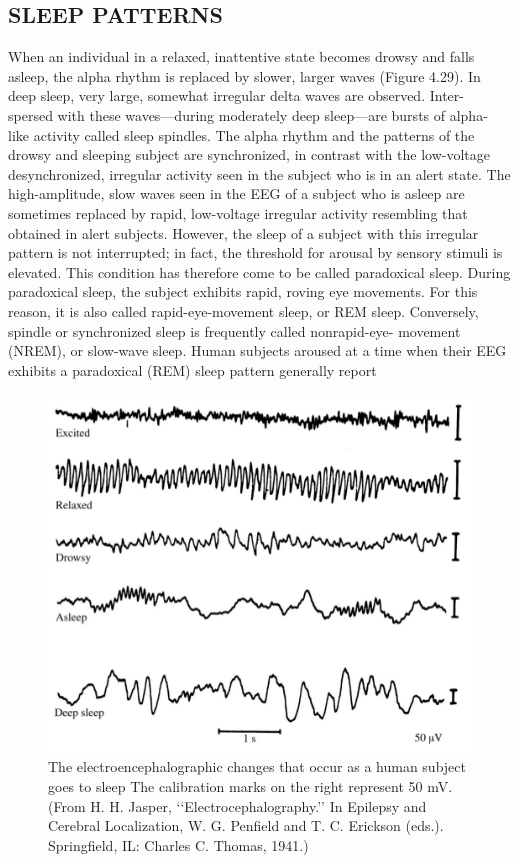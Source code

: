
\subsection{SLEEP PATTERNS}

When an individual in a relaxed, inattentive state becomes drowsy and falls
asleep, the alpha rhythm is replaced by slower, larger waves (Figure 4.29). In
deep sleep, very large, somewhat irregular delta waves are observed. Inter-
spersed with these waves—during moderately deep sleep—are bursts of alpha-
like activity called sleep spindles. The alpha rhythm and the patterns of the
drowsy and sleeping subject are synchronized, in contrast with the low-voltage
desynchronized, irregular activity seen in the subject who is in an alert state.
The high-amplitude, slow waves seen in the EEG of a subject who is asleep
are sometimes replaced by rapid, low-voltage irregular activity resembling that
obtained in alert subjects. However, the sleep of a subject with this irregular
pattern is not interrupted; in fact, the threshold for arousal by sensory stimuli is
elevated. This condition has therefore come to be called paradoxical sleep.
During paradoxical sleep, the subject exhibits rapid, roving eye movements.
For this reason, it is also called rapid-eye-movement sleep, or REM sleep.
Conversely, spindle or synchronized sleep is frequently called nonrapid-eye-
movement (NREM), or slow-wave sleep. Human subjects aroused at a time
when their EEG exhibits a paradoxical (REM) sleep pattern generally report

\begin{figure}
\centering
\includegraphics[width=0.7\linewidth]{figura_7.png} 
\caption{The electroencephalographic changes that occur as a human subject
goes to sleep The calibration marks on the right represent 50 mV. (From H.
H. Jasper, ‘‘Electrocephalography.’’ In Epilepsy and Cerebral Localization, W.
G. Penfield and T. C. Erickson (eds.). Springfield, IL: Charles C. Thomas,
1941.)}
\end{figure}

